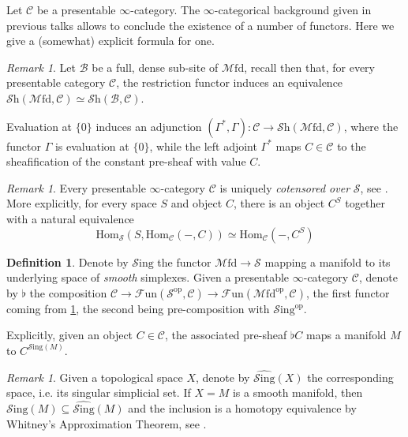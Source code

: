 \documentclass[a4paper]{book}
\newcommand{\lB}{\mathcal{B}}
\newcommand{\lC}{\mathcal{C}}
\newcommand{\lF}{\mathcal{F}}
\newcommand{\lM}{\mathcal{M}}
\newcommand{\lS}{\mathcal{S}}
\newcommand{\op}{\mathrm{op}}
\newcommand{\Fun}{\lF\mathrm{un}} %
\newcommand{\Shv}{\lS\mathrm{h}} %
\newcommand{\Sing}{\lS\mathrm{ing}} %
\renewcommand{\hom}{\mathrm{Hom}} %
\newcommand{\Mfd}{\lM\mathrm{fd}} %
\theoremstyle{definition}
\newtheorem{definition}[equation]{Definition}
\theoremstyle{remark}
\newtheorem{remark}[equation]{Remark}
\numberwithin{equation}{section}
\begin{document}
Let $\lC$ be a presentable $\infty$-category. The $\infty$-categorical background given in previous talks allows to conclude the existence of a number of functors. Here we give a (somewhat) explicit formula for one. 
\begin{remark}
  Let $\lB$ be a full, dense sub-site of $\Mfd$, recall then that, for every presentable category $\lC$, the restriction functor induces an equivalence $\Shv(\Mfd,\lC)\simeq\Shv(\lB,\lC)$. 
\end{remark}
Evaluation at $\{0\}$ induces an adjunction $(\Gamma^*,\Gamma):\lC\to\Shv(\Mfd,\lC)$, where the functor $\Gamma$ is evaluation at $\{0\}$, while the left adjoint $\Gamma^*$ maps $C\in\lC$ to the sheafification of the constant pre-sheaf with value $C$. 
\begin{remark}\label{rmk:cotensor}
Every presentable $\infty$-category $\lC$ is uniquely \emph{cotensored over} $\lS$, see \cite[Remark 5.5.2.6]{lurie2009htt}. More explicitly, for every space $S$ and object $C$, there is an object $C^S$ together with a natural equivalence \[\hom_\lS(S,\hom_\lC(-,C))\simeq\hom_\lC(-,C^S)\]
\end{remark}
\begin{definition}\label{def:flat}
  Denote by $\Sing$ the functor $\Mfd\to\lS$ mapping a manifold to its underlying space of \emph{smooth} simplexes. Given a presentable $\infty$-category $\lC$, denote by $\flat$ the composition $\lC\to\Fun(\lS^{\op},\lC)\to\Fun(\Mfd^{\op},\lC)$, the first functor coming from \cref{rmk:cotensor}, the second being pre-composition with $\Sing^{\op}$.
\end{definition}
Explicitly, given an object $C\in\lC$, the associated pre-sheaf $\flat C$ maps a manifold $M$ to $C^{\Sing(M)}$.
\begin{remark}
  Given a topological space $X$, denote by $\widehat{\Sing}(X)$ the corresponding space, i.e. its singular simplicial set. If $X=M$ is a smooth manifold, then $\Sing(M)\subseteq\widehat{\Sing}(M)$ and the inclusion is a homotopy equivalence by Whitney's Approximation Theorem, see \cite[Theorem 1.6]{zuoqin2021whitney}. 
\end{remark}
\end{document}
